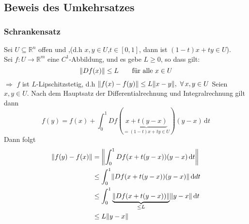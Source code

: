 \subsection{Beweis des Umkehrsatzes} %
\label{sub:beweis_des_umkehrsatzes}
\subsubsection{Schrankensatz} %
\label{ssub:schrankensatz}
Sei $ U \subseteq \mathbb{R}^n$ offen und ,(d.h $x,y \in U$,$t \in [0,1]$, dann ist $(1-t)x+ty \in U$). \\
Sei $ f: U \to \mathbb{R}^m $ eine $C^1$-Abbildung, und es gebe $L \geq 0$, so dass gilt:
\[
	\norm{Df(x)}\leq L \qquad \text{für alle }x \in U
\] 
$\Rightarrow$ $f$ ist $L$-Lipschitzstetig, d.h $\norm{f(x)-f(y)}\leq L \norm{x-y}, \,\, \forall\, x,y \in U$
 Seien $x,y \in U$. Nach dem Hauptsatz der Differentialrechnung und Integralrechnung gilt dann
\[
	f(y) = f(x)+ \int_{0}^{1} Df(\underset{=(1-t)x+ty \in U}{\underbrace{x+t(y-x)}})(y-x) \,\mathrm{d}t
\]
Dann folgt
\begin{align*}
	\norm{f(y)-f(x)}&= \norm{\int_{0}^{1}Df(x+t(y-x))(y-x) \,\mathrm{d}t} \\
	&\leq \int_{0}^{1}\norm{Df(x+t(y-x))(y-x)} \,\mathrm{d}dt \\
	&\leq \int_{0}^{1} \underset{\leq L}{\underbrace{\norm{Df(x+t(y-x))}}}\norm{y-x} \,\mathrm{d}t \\
	& \leq L \norm{y-x}
\end{align*} \bewende
